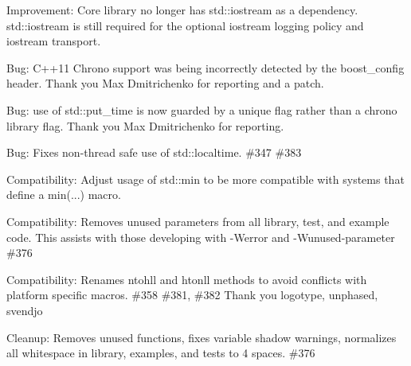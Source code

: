\begin{DoxyItemize}
\item Improvement\+: Core library no longer has std\+::iostream as a dependency. std\+::iostream is still required for the optional iostream logging policy and iostream transport.
\item Bug\+: C++11 Chrono support was being incorrectly detected by the {\ttfamily boost\+\_\+config} header. Thank you Max Dmitrichenko for reporting and a patch.
\item Bug\+: use of {\ttfamily std\+::put\+\_\+time} is now guarded by a unique flag rather than a chrono library flag. Thank you Max Dmitrichenko for reporting.
\item Bug\+: Fixes non-\/thread safe use of std\+::localtime. \#347 \#383
\item Compatibility\+: Adjust usage of std\+::min to be more compatible with systems that define a min(...) macro.
\item Compatibility\+: Removes unused parameters from all library, test, and example code. This assists with those developing with -\/Werror and -\/Wunused-\/parameter \#376
\item Compatibility\+: Renames ntohll and htonll methods to avoid conflicts with platform specific macros. \#358 \#381, \#382 Thank you logotype, unphased, svendjo
\item Cleanup\+: Removes unused functions, fixes variable shadow warnings, normalizes all whitespace in library, examples, and tests to 4 spaces. \#376
\end{DoxyItemize}

